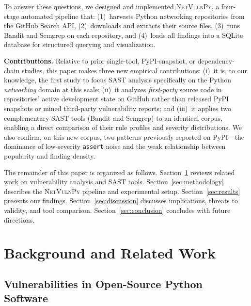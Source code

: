 \documentclass[sigconf,authordraft]{acmart}
\begin{document}
To answer these questions, we designed and implemented
\textsc{NetVulnPy}, a four-stage automated pipeline that:
(1)~harvests Python networking repositories from the GitHub Search
API, (2)~downloads and extracts their source files,
(3)~runs Bandit and Semgrep on each repository, and
(4)~loads all findings into a SQLite database for structured
querying and visualization.

\textbf{Contributions.} Relative to prior single-tool, PyPI-snapshot,
or dependency-chain studies, this paper makes three new empirical
contributions: (i)~it is, to our knowledge, the first study to focus
SAST analysis specifically on the Python \emph{networking} domain at
this scale; (ii)~it analyzes \emph{first-party} source code in repositories'
active development state on GitHub rather than released PyPI snapshots or
mined third-party vulnerability reports; and (iii)~it applies two
complementary SAST tools (Bandit and Semgrep) to an identical corpus,
enabling a direct comparison of their rule profiles and severity
distributions. We also confirm, on this new corpus, two patterns previously
reported on PyPI---the dominance of low-severity \texttt{assert} noise and
the weak relationship between popularity and finding density.

The remainder of this paper is organized as follows.
Section~\ref{sec:background} reviews related work on vulnerability
analysis and SAST tools. Section~\ref{sec:methodology} describes the
\textsc{NetVulnPy} pipeline and experimental setup.
Section~\ref{sec:results} presents our findings.
Section~\ref{sec:discussion} discusses implications, threats to
validity, and tool comparison. Section~\ref{sec:conclusion} concludes
with future directions.


\section{Background and Related Work}
\label{sec:background}

\subsection{Vulnerabilities in Open-Source Python Software}
\end{document}
